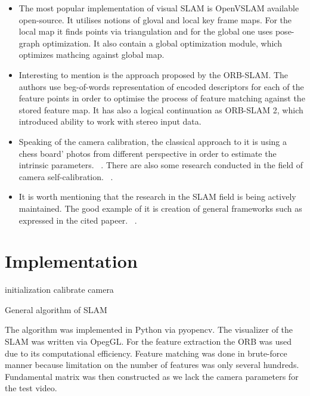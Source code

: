 \begin{itemize}
    \item The most popular implementation of visual SLAM is OpenVSLAM available open-source. It utilises notions of gloval and local key frame maps. For the local map it finds points via triangulation and for the global one uses pose-graph optimization. It also contain a global optimization module, which optimizes mathcing against global map. ~\cite{OpenVSLAM}
    \item Interesting to mention is the approach proposed by the ORB-SLAM. The authors use beg-of-words representation of encoded descriptors for each of the feature points in order to optimise the process of feature matching against the stored feature map. It has also a logical continuation as ORB-SLAM 2, which introduced ability to work with stereo input data. ~\cite{ORB_SLAM}
    \item Speaking of the camera calibration, the classical approach to it is using a chess board' photos from different perspective in order to estimate the intrinsic parameters. ~\cite{Camera_Calibration}. There are also some research conducted in the field of camera self-calibration. ~\cite{Self_Calibration}.
    \item It is worth mentioning that the research in the SLAM field is being actively maintained. The good example of it is creation of general frameworks such as expressed in the cited papeer. ~\cite{GeneralFramework}.
\end{itemize}

\section{Implementation}

\begin{algorithm}[H]

	initialization\;
	calibrate camera\;
	\caption{General algorithm of SLAM}
\end{algorithm}

\vskip 1cm
The algorithm was implemented in Python via pyopencv. The visualizer of the SLAM was written via OpegGL. For the feature extraction the ORB was used due to its computational efficiency. Feature matching was done in brute-force manner because limitation on the number of features was only several hundreds. Fundamental matrix was then constructed as we lack the camera parameters for the test video. 

